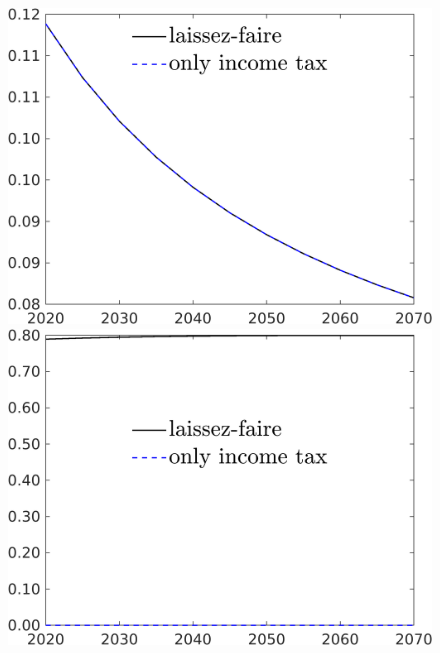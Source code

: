 \begin{figure}[h!!]
\begin{minipage}[]{0.32\textwidth}
	\end{minipage}
	\begin{minipage}[]{0.32\textwidth}
		\includegraphics[width=1\textwidth]{../../codding_model/own_basedOnFried/optimalPol_190722_tidiedUp/figures/all_10Aout22/CountTaul_modtest_target_sg_spillover0_sep1_extern0_PV1_etaa0.79_lgd1.png}
	\end{minipage}
	\begin{minipage}[]{0.32\textwidth}
		\includegraphics[width=1\textwidth]{../../codding_model/own_basedOnFried/optimalPol_190722_tidiedUp/figures/all_10Aout22/CountTaul_modtest_target_snS_spillover0_sep1_extern0_PV1_etaa0.79_lgd1.png}

\end{minipage}
\end{figure}
